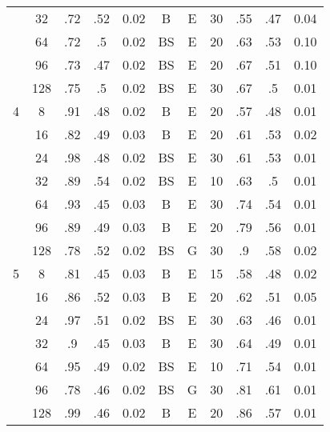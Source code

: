 \begin{table}
\begin{tabular}{|c|c|cccccc||ccc|}
  &  32 &   .72 &  .52 &     0.02 &       B &         E & 30 &   .55 &  .47 & 0.04 \\
  &  64 &   .72 &   .5 &     0.02 &      BS &         E & 20 &   .63 &  .53 & 0.10 \\
  &  96 &   .73 &  .47 &     0.02 &      BS &         E & 20 &   .67 &  .51 & 0.10 \\
  & 128 &   .75 &   .5 &     0.02 &      BS &         E & 30 &   .67 &   .5 & 0.01 \\\hline
4 &   8 &   .91 &  .48 &     0.02 &       B &         E & 20 &   .57 &  .48 & 0.01 \\
  &  16 &   .82 &  .49 &     0.03 &       B &         E & 20 &   .61 &  .53 & 0.02 \\
  &  24 &   .98 &  .48 &     0.02 &      BS &         E & 30 &   .61 &  .53 & 0.01 \\
  &  32 &   .89 &  .54 &     0.02 &      BS &         E & 10 &   .63 &   .5 & 0.01 \\
  &  64 &   .93 &  .45 &     0.03 &       B &         E & 30 &   .74 &  .54 & 0.01 \\
  &  96 &   .89 &  .49 &     0.03 &       B &         E & 20 &   .79 &  .56 & 0.01 \\
  & 128 &   .78 &  .52 &     0.02 &      BS &         G & 30 &    .9 &  .58 & 0.02 \\\hline
5 &   8 &   .81 &  .45 &     0.03 &       B &         E & 15 &   .58 &  .48 & 0.02 \\
  &  16 &   .86 &  .52 &     0.03 &       B &         E & 20 &   .62 &  .51 & 0.05 \\
  &  24 &   .97 &  .51 &     0.02 &      BS &         E & 30 &   .63 &  .46 & 0.01 \\
  &  32 &    .9 &  .45 &     0.03 &       B &         E & 30 &   .64 &  .49 & 0.01 \\
  &  64 &   .95 &  .49 &     0.02 &      BS &         E & 10 &   .71 &  .54 & 0.01 \\
  &  96 &   .78 &  .46 &     0.02 &      BS &         G & 30 &   .81 &  .61 & 0.01 \\
  & 128 &   .99 &  .46 &     0.02 &       B &         E & 20 &   .86 &  .57 & 0.01 \\\hline
\end{tabular}
\end{table}
